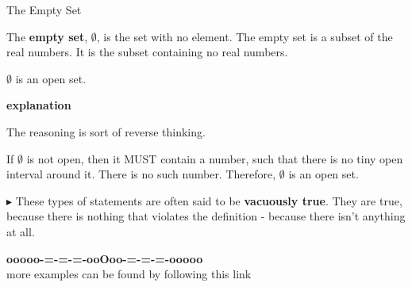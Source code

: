 \documentclass{ximera}
\begin{document}
\begin{example}  The Empty Set


The \textbf{empty set}, $\emptyset$, is the set with no element.  The empty set is a subset of the real numbers.  It is the subset containing no real numbers. 


$\emptyset$ is an open set. 



\textbf{\textcolor{red!75!green}{explanation}} 


The reasoning is sort of reverse thinking.  

If $\emptyset$ is not open, then it MUST contain a number, such that there is no tiny open interval around it.  There is no such number.  Therefore, $\emptyset$ is an open set.




\end{example}

$\blacktriangleright$ These types of statements are often said to be \textbf{vacuously true}.  They are true, because there is nothing that violates the definition - because there isn't anything at all. 











\begin{center}
\textbf{\textcolor{green!50!black}{ooooo-=-=-=-ooOoo-=-=-=-ooooo}} \\

more examples can be found by following this link\\ 

\end{center}
\end{document}
